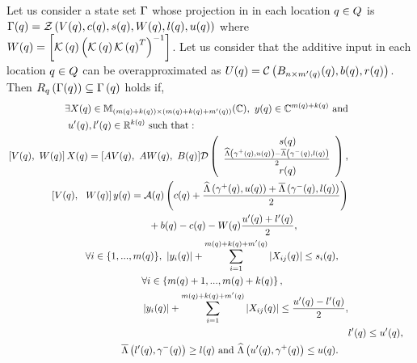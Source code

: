 \begin{lemma}
  Let  
  us consider a state set $\Gamma$ whose projection in in each
  location $q\in Q$ is $\Gamma(q) =
  \mathcal{Z}\left(V(q),c(q),s(q),W(q),l(q),u(q)\right)$ where
  $W(q)={\left[\mathcal{K}\left(q\right)\left(\mathcal{K}\left(q\right)\mathcal{K}\left(q\right)^T\right)^{-1}\right]}$.  Let us consider that the additive input in each location
  $q\in Q$ can be overapproximated as $U(q) = \mathcal{C}\left(B_{n\times
      m^\prime(q)}(q),b(q),r(q)\right)$.  Then
   $R_{q}\left(\Gamma(q)\right)
  \subseteq \Gamma\left(q\right)$ holds if,
\begin{align}
\begin{split}
& \exists X(\loc)\in\mat{\lt(m(\loc)+k(\loc)\rt)}{\lt(m(\loc)+k(\loc)+m^\pr(\loc)\rt)}{\mb{C}},~
y(\loc)\in\mb{C}^{m(\loc)+k(\loc)}~\text{and}\\&~u^\pr(\loc),l^\pr(\loc)\in\realset^{k(\loc)}~\text{such
  that}:
\end{split}\\
\begin{split}
& \left[V(\loc),~W(\loc)\rt]X(\loc) =
  [AV(\loc),~AW(\loc),~B(\loc)]\dg\lt(\cjoin{\hspace{3em}~~~~~~~~s(\loc)}{\frac{\minaffine{\stay^+(\loc)}{u(\loc)}
      -\maxaffine{\stay^-(\loc)}{l(\loc)}}{2}}{\hspace{3em}~~~~~~~~r(\loc)}\rt),\\
\end{split}\\
\begin{split}
  & \left[V(\loc),~~W(\loc)\rt]y(\loc) = 
    \map(\loc)\lt(c(\loc)+\frac{\minaffine{\stay^+(\loc)}{u(\loc)}
     +\maxaffine{\stay^-(\loc)}{l(\loc)}}{2}\rt)\\ & \hspace{10em} +
  b(\loc)-c(\loc)-W(\loc)\frac{u^\pr(\loc)+l^\pr(\loc)}{2},
\end{split}\\
\begin{split}
& \forall
i\in\tup{m(\loc)},~\lt|y_i(\loc)\rt|+\sum_{i=1}^{m(\loc)+k(\loc)+m^\pr(\loc)}\lt|X_{ij}(\loc)\rt|\leq
s_i(\loc),
\end{split}\\
\begin{split}
& \forall
i\in\lt\{m(\loc)+1,...,m(\loc)+k(\loc)\rt\},\\
&\lt|y_i(\loc)\rt|+\sum_{i=1}^{m(\loc)+k(\loc)+m^\pr(\loc)}\lt|X_{ij}(\loc)\rt|\leq
\frac{u^\pr(\loc)-l^\pr(\loc)}{2},
\end{split}\\
& l^\pr(\loc)\leq u^\pr(\loc),\\
\begin{split}
& \maxaffine{l^\pr(\loc)}{\stay^-(\loc)}\geq
l(\loc)~\text{and}~\minaffine{u^\pr(\loc)}{\stay^+(\loc)}\leq u(\loc).
\end{split}
\end{align}
\end{lemma}

